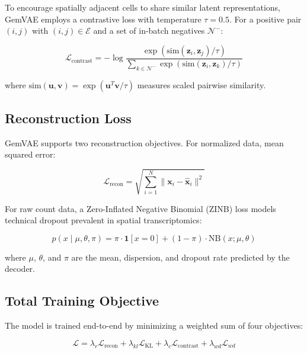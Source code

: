 \documentclass[conference]{IEEEtran}
\begin{document}
To encourage spatially adjacent cells to share similar latent representations, GemVAE employs a contrastive loss with temperature $\tau = 0.5$. For a positive pair $(i, j)$ with $(i,j) \in \mathcal{E}$ and a set of in-batch negatives $\mathcal{N}^-$:

\begin{equation}
    \mathcal{L}_{\text{contrast}} = -\log \frac{\exp(\text{sim}(\mathbf{z}_i, \mathbf{z}_j) / \tau)}{\sum_{k \in \mathcal{N}^-} \exp(\text{sim}(\mathbf{z}_i, \mathbf{z}_k) / \tau)}
\end{equation}

where $\text{sim}(\mathbf{u}, \mathbf{v}) = \exp(\mathbf{u}^T \mathbf{v} / \tau)$ measures scaled pairwise similarity.

\subsection{Reconstruction Loss}

GemVAE supports two reconstruction objectives. For normalized data, mean squared error:

\begin{equation}
    \mathcal{L}_{\text{recon}} = \sqrt{\sum_{i=1}^{N} \|\mathbf{x}_i - \hat{\mathbf{x}}_i\|^2}
\end{equation}

For raw count data, a Zero-Inflated Negative Binomial (ZINB) loss models technical dropout prevalent in spatial transcriptomics:

\begin{equation}
    p(x \mid \mu, \theta, \pi) = \pi \cdot \mathbf{1}[x=0] + (1-\pi) \cdot \text{NB}(x; \mu, \theta)
\end{equation}

where $\mu$, $\theta$, and $\pi$ are the mean, dispersion, and dropout rate predicted by the decoder.

\subsection{Total Training Objective}

The model is trained end-to-end by minimizing a weighted sum of four objectives:

\begin{equation}
    \mathcal{L} = \lambda_r \mathcal{L}_{\text{recon}} + \lambda_{kl} \mathcal{L}_{\text{KL}} + \lambda_c \mathcal{L}_{\text{contrast}} + \lambda_{wd} \mathcal{L}_{wd}
\end{equation}
\end{document}
